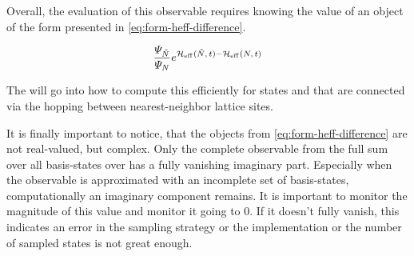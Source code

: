 Overall, the evaluation of this observable requires knowing the value of an object of the form presented in \autoref{eq:form-heff-difference}.

\begin{equation}
    \label{eq:form-heff-difference}
    \frac{\psiN[\tilde{N}]}{\psiN} e^{\HeffOft[\tilde{N}]-\HeffOft[N]}
\end{equation}

The  will go into how to compute this efficiently for states \ketN[N] and  that are connected via the hopping between nearest-neighbor lattice sites.

It is finally important to notice, that the objects from \autoref{eq:form-heff-difference} are not real-valued, but complex.
Only the complete observable from the full sum over all basis-states \ketN over  has a fully vanishing imaginary part. 
Especially when the observable is approximated with an incomplete set of basis-states, computationally an imaginary component remains. 
It is important to monitor the magnitude of this value and monitor it going to $0$.
If it doesn't fully vanish, this indicates an error in the sampling strategy or the implementation or the number of sampled states is not great enough.

